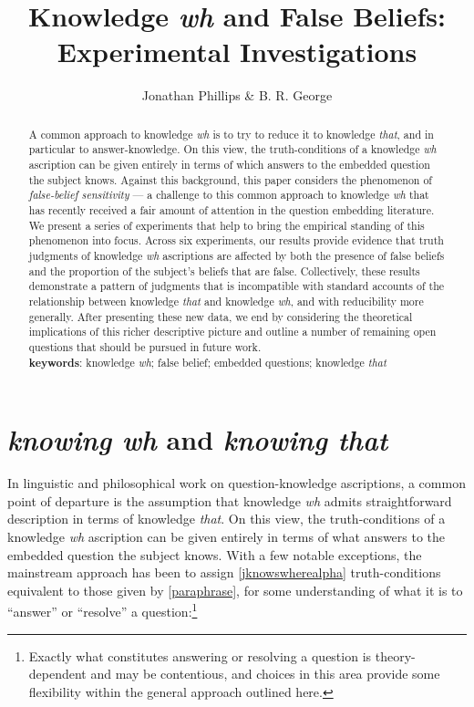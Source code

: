 \documentclass[a4paper]{article}
\title{Knowledge \textit{wh} and False Beliefs:\\Experimental Investigations}
\author{Jonathan Phillips \& B. R. George}
\begin{document}
\maketitle


\begin{abstract}A common approach to knowledge \textit{wh} is to try to reduce it to knowledge \textit{that}, and in particular to answer-knowledge. On this view, the truth-conditions of a knowledge \textit{wh} ascription can be given entirely in terms of which answers to the embedded question the subject knows. Against this background, this paper considers the phenomenon of \emph{false-belief sensitivity} --- a challenge to this common approach to knowledge \textit{wh} that has recently received a fair amount of attention in the question embedding literature. We present a series of experiments that help to bring the empirical standing of this phenomenon into focus. Across six experiments, our results provide evidence that truth judgments of knowledge \textit{wh} ascriptions are affected by both the presence of false beliefs and the proportion of the subject's beliefs that are false. Collectively, these results demonstrate a pattern of judgments that is incompatible with standard accounts of the relationship between knowledge \textit{that} and knowledge \textit{wh}, and with reducibility more generally. After presenting these new data, we end by considering the theoretical implications of this richer descriptive picture and outline a number of remaining open questions that should be pursued in future work.\\

\noindent \textbf{keywords}: knowledge \textit{wh}; false belief; embedded questions; knowledge \textit{that}
\end{abstract}


\section{\textit{knowing wh} and \textit{knowing that}}

In linguistic and philosophical work on question-knowledge ascriptions, a common point of departure is the assumption that knowledge \textit{wh} admits straightforward description in terms of knowledge \textit{that}. On this view, the truth-conditions of a knowledge \textit{wh} ascription can be given entirely in terms of what answers to the embedded question the subject knows. With a few notable exceptions, the mainstream approach has been to assign \ref{jknowswherealpha} truth-conditions equivalent to those given by \ref{paraphrase}, for some understanding of what it is to ``answer'' or ``resolve'' a question:\footnote{Exactly what constitutes answering or resolving a question is theory-dependent and may be contentious, and choices in this area provide some flexibility within the general approach outlined here.}
\end{document}
